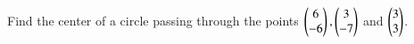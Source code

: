 \begin{flushleft}
Find the center of a circle passing through the points $\begin{pmatrix}6\\-6\end{pmatrix}, \begin{pmatrix}3\\-7\end{pmatrix}$ and $\begin{pmatrix}3\\3\end{pmatrix}$.
\end{flushleft}
\pagebreak
